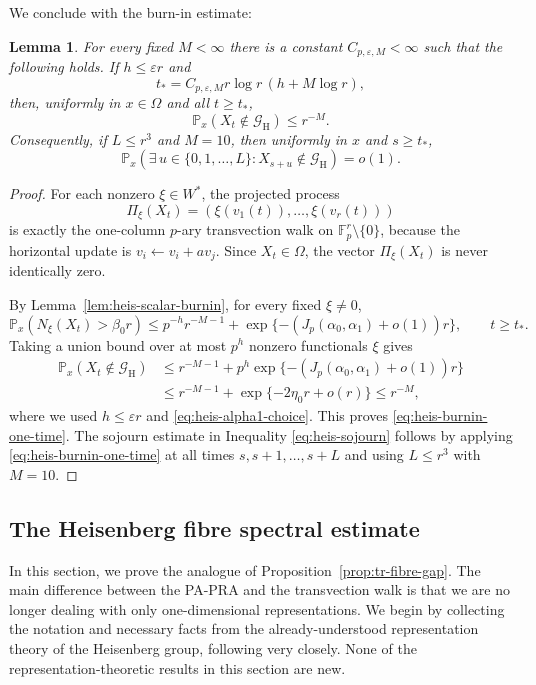 \documentclass[11pt, reqno]{amsart}
\numberwithin{equation}{section}
\newtheorem{lemma}[theorem]{Lemma}
\newcommand{\Fp}{\mathbb F_p}
\newcommand{\Prob}{\mathbb P}
\newcommand{\Good}{\mathcal G}
\begin{document}
We conclude with the burn-in estimate:

\begin{lemma}\label{lem:heis-burnin}
For every fixed \(M<\infty\) there is a constant
\(C_{p,\varepsilon,M}<\infty\) such that the following holds.  If
\(h\le\varepsilon r\) and
\begin{equation}\label{eq:heis-tstar}
    t_*=C_{p,\varepsilon,M}r\log r\,(h+M\log r),
\end{equation}
then, uniformly in \(x\in\Omega\) and all \(t\ge t_*\),
\begin{equation}\label{eq:heis-burnin-one-time}
    \Prob_x(X_t\notin\Good_{\mathrm H})\le r^{-M}.
\end{equation}
Consequently, if \(L\le r^3\) and \(M=10\), then uniformly in \(x\) and
\(s\ge t_*\),
\begin{equation}\label{eq:heis-sojourn}
    \Prob_x(\exists\,u\in\{0,1,\ldots,L\}:X_{s+u}\notin\Good_{\mathrm H})=o(1).
\end{equation}
\end{lemma}

\begin{proof}
For each nonzero \(\xi\in W^*\), the projected process
\[
    \Pi_\xi(X_t)=(\xi(v_1(t)),\ldots,\xi(v_r(t)))
\]
is exactly the one-column \(p\)-ary transvection walk on
\(\Fp^r\setminus\{0\}\), because the horizontal update is
\(v_i\leftarrow v_i+a v_j\).  Since \(X_t\in\Omega\), the vector
\(\Pi_\xi(X_t)\) is never identically zero.

By Lemma~\ref{lem:heis-scalar-burnin}, for every fixed \(\xi\ne0\),
\[
    \Prob_x(N_\xi(X_t)>\beta_0r)
    \le p^{-h}r^{-M-1}+\exp\{-(J_p(\alpha_0,\alpha_1)+o(1))r\},
    \qquad t\ge t_*.
\]
Taking a union bound over at most \(p^h\) nonzero functionals $\xi$ gives
\[
\begin{aligned}
    \Prob_x(X_t\notin\Good_{\mathrm H})
    &\le r^{-M-1}+p^h\exp\{-(J_p(\alpha_0,\alpha_1)+o(1))r\}\\
    &\le r^{-M-1}+\exp\{-2\eta_0r+o(r)\}
    \le r^{-M},
\end{aligned}
\]
where we used \(h\le\varepsilon r\) and \eqref{eq:heis-alpha1-choice}.  This
proves \eqref{eq:heis-burnin-one-time}.  The sojourn estimate in Inequality \eqref{eq:heis-sojourn} follows by
applying \eqref{eq:heis-burnin-one-time} at all times
\(s,s+1,\ldots,s+L\) and using \(L\le r^3\) with \(M=10\).
\end{proof}

\subsection{The Heisenberg fibre spectral estimate}\label{subsec:heis-fibre-spectrum}
In this section, we prove the analogue of Proposition~\ref{prop:tr-fibre-gap}. The main difference between the PA-PRA and the transvection walk is that we are no longer dealing with only one-dimensional representations. We begin by collecting the notation and necessary facts from the already-understood representation theory of the Heisenberg group, following \cite{Misaghian2010} very closely. None of the representation-theoretic results in this section are new.
\end{document}
